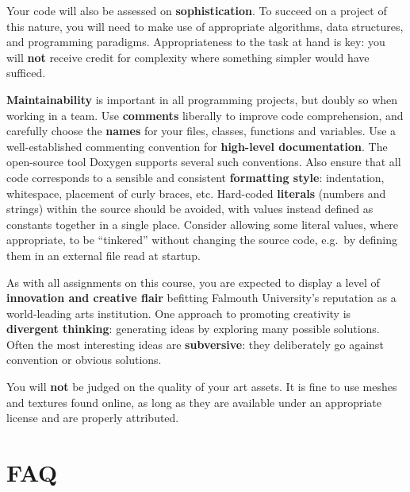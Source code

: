 \documentclass{../../fal_assignment}
\begin{document}
Your code will also be assessed on \textbf{sophistication}.
To succeed on a project of this nature,
you will need to make use of appropriate algorithms, data structures, and programming paradigms.
Appropriateness to the task at hand is key:
you will \textbf{not} receive credit for complexity  
where something simpler would have sufficed.

\textbf{Maintainability} is important in all programming projects,
but doubly so when working in a team.
Use \textbf{comments} liberally to improve code comprehension,
and carefully choose the \textbf{names} for your files, classes, functions and variables.
Use a well-established commenting convention
for \textbf{high-level documentation}.
The open-source tool Doxygen supports several such conventions.
Also ensure that all code corresponds to a sensible and consistent \textbf{formatting style}:
indentation, whitespace, placement of curly braces, etc.
Hard-coded \textbf{literals} (numbers and strings) within the source should be avoided,
with values instead defined as constants together in a single place.
Consider allowing some literal values, where appropriate, to be ``tinkered'' without changing the source code,
e.g.\ by defining them in an external file read at startup.

As with all assignments on this course, you are expected to display a level of
\textbf{innovation and creative flair} befitting Falmouth University's reputation as a world-leading
arts institution.
One approach to promoting creativity is
\textbf{divergent thinking}: generating ideas by exploring many possible solutions.
Often the most interesting ideas are \textbf{subversive}: they deliberately go against
convention or obvious solutions.

You will \textbf{not} be judged on the quality of your art assets.
It is fine to use meshes and textures found online,
as long as they are available under an appropriate license and are properly attributed.

\section*{FAQ}
\end{document}
